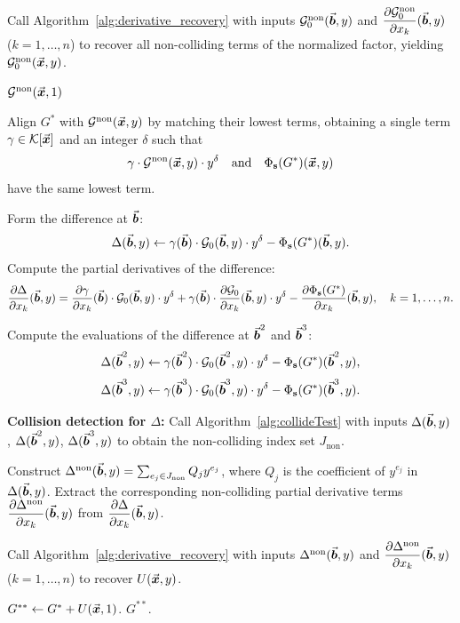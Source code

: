 \documentclass{article}
\numberwithin{equation}{section}
\begin{document}
\begin{algorithm}[p]
\begin{algorithmic}[1]

\State Call Algorithm~\ref{alg:derivative_recovery} with inputs $\mathcal{G}_0^{\text{non}}(\vec{\boldsymbol{b}},y)$ and $\dfrac{\partial \mathcal{G}_0^{\text{non}}}{\partial x_k}(\vec{\boldsymbol{b}},y)$ ($k=1,\dots,n$) to recover all non-colliding terms of the normalized factor, yielding $\mathcal{G}_0^{\text{non}}(\vec{\boldsymbol{x}},y)$.

 \State \Return $\mathcal{G}^{\text{non}}(\vec{\boldsymbol{x}},1)$ \EndIf

\State Align $G^*$ with $\mathcal{G}^{\text{non}}(\vec{\boldsymbol{x}},y)$ by matching their lowest terms, obtaining a single term $\gamma\in {\mathcal{K}}[\vec{\boldsymbol{x}}]$ and an integer $\delta$ such that
\[
\gamma \cdot \mathcal{G}^{\text{non}}(\vec{\boldsymbol{x}},y) \cdot y^{\delta} \quad \text{and} \quad \Phi_{\mathbf{s}}(G^*)(\vec{\boldsymbol{x}},y)
\]
have the same lowest term.

\State Form the difference at $\vec{\boldsymbol{b}}$:
\[
\Delta(\vec{\boldsymbol{b}},y) \gets \gamma(\vec{\boldsymbol{b}}) \cdot \mathcal{G}_0(\vec{\boldsymbol{b}},y) \cdot y^{\delta} - \Phi_{\mathbf{s}}(G^*)(\vec{\boldsymbol{b}},y).
\]
\State Compute the partial derivatives of the difference:
\[
\frac{\partial \Delta}{\partial x_k}(\vec{\boldsymbol{b}},y)
=
\frac{\partial \gamma}{\partial x_k}(\vec{\boldsymbol{b}}) \cdot \mathcal{G}_0(\vec{\boldsymbol{b}},y) \cdot y^{\delta}
+ \gamma(\vec{\boldsymbol{b}}) \cdot \frac{\partial \mathcal{G}_0}{\partial x_k}(\vec{\boldsymbol{b}},y) \cdot y^{\delta}
- \frac{\partial \Phi_{\mathbf{s}}(G^*)}{\partial x_k}(\vec{\boldsymbol{b}},y),
\quad k=1,\dots,n.
\]

\State Compute the evaluations of the difference at $\vec{\boldsymbol{b}}^2$ and $\vec{\boldsymbol{b}}^3$:
\[
\Delta(\vec{\boldsymbol{b}}^2,y) \gets \gamma(\vec{\boldsymbol{b}}^2) \cdot \mathcal{G}_0(\vec{\boldsymbol{b}}^2,y) \cdot y^{\delta} - \Phi_{\mathbf{s}}(G^*)(\vec{\boldsymbol{b}}^2,y),
\]
\[
\Delta(\vec{\boldsymbol{b}}^3,y) \gets \gamma(\vec{\boldsymbol{b}}^3) \cdot \mathcal{G}_0(\vec{\boldsymbol{b}}^3,y) \cdot y^{\delta} - \Phi_{\mathbf{s}}(G^*)(\vec{\boldsymbol{b}}^3,y).
\]

 \textbf{Collision detection for $\Delta$:}
\State Call Algorithm~\ref{alg:collideTest} with inputs $\Delta(\vec{\boldsymbol{b}},y)$, $\Delta(\vec{\boldsymbol{b}}^2,y)$, $\Delta(\vec{\boldsymbol{b}}^3,y)$ to obtain the non-colliding index set $J_{\text{non}}$.

\State Construct $\Delta^{\text{non}}(\vec{\boldsymbol{b}},y) = \sum_{e_j \in J_{\text{non}}} Q_j y^{e_j}$, where $Q_j$ is the coefficient of $y^{e_j}$ in $\Delta(\vec{\boldsymbol{b}},y)$.
    \State Extract the corresponding non-colliding partial derivative terms $\dfrac{\partial \Delta^{\text{non}}}{\partial x_k}(\vec{\boldsymbol{b}},y)$ from $\dfrac{\partial \Delta}{\partial x_k}(\vec{\boldsymbol{b}},y)$.
\EndFor

\State Call Algorithm~\ref{alg:derivative_recovery} with inputs $\Delta^{\text{non}}(\vec{\boldsymbol{b}},y)$ and $\dfrac{\partial \Delta^{\text{non}}}{\partial x_k}(\vec{\boldsymbol{b}},y)$ ($k=1,\dots,n$) to recover $U(\vec{\boldsymbol{x}},y)$.

\State $G^{**} \gets G^* + U(\vec{\boldsymbol{x}},1)$.
\State \Return $G^{**}$.
\end{algorithmic}
\end{algorithm}
\end{document}
